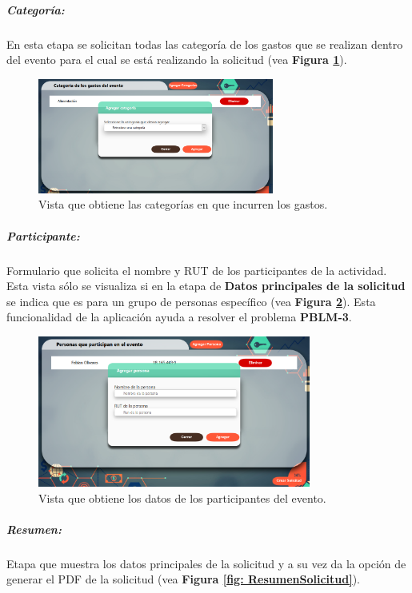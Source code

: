     \subparagraph{\emph{Categoría: }} En esta etapa se solicitan todas las categoría de los gastos que se realizan dentro del evento para el cual se está realizando la solicitud (vea \textbf{Figura \ref{fig: Categorias}}).

    \begin{figure}[h]
        \centering
        \includegraphics[width= 0.69\textwidth]{Imagenes/Categoria.PNG}
        \caption{\label{fig: Categorias}Vista que obtiene las categorías en que incurren los gastos.}
    \end{figure}

    \subparagraph{\emph{Participante: }} Formulario que solicita el nombre y RUT de los participantes de la actividad. Esta vista sólo se visualiza si en la etapa de \textbf{Datos principales de la solicitud} se indica que es para un grupo de personas específico (vea \textbf{Figura \ref{fig: Personas}}). Esta funcionalidad de la aplicación ayuda a resolver el problema \textbf{PBLM-3}. 

    \begin{figure}[h]
        \centering
        \includegraphics[width= 0.8\textwidth]{Imagenes/AgregarPersonas.PNG}
        \caption{\label{fig: Personas}Vista que obtiene los datos de los participantes del evento.}
    \end{figure}

    \subparagraph{\emph{Resumen: }} Etapa que muestra los datos principales de la solicitud y a su vez da la opción de generar el PDF de la solicitud (vea \textbf{Figura \ref{fig: ResumenSolicitud}}).

